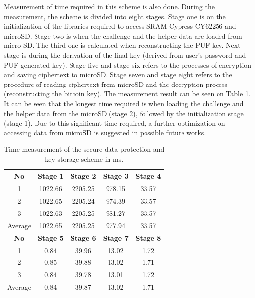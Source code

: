 Measurement of time required in this scheme is also done. During the measurement, the scheme is divided into eight stages. Stage one is on the initialization of the libraries required to access SRAM Cypress CY62256 and microSD. Stage two is when the challenge and the helper data are loaded from micro SD. The third one is calculated when reconstructing the PUF key. Next stage is during the derivation of the final key (derived from user's password and PUF-generated key). Stage five and stage six refers to the processes of encryption and saving ciphertext to microSD. Stage seven and stage eight refers to the procedure of reading ciphertext from microSD and the decryption process (reconstructing the bitcoin key). The measurement result can be seen on Table \ref{tab:time_scheme}. It can be seen that the longest time required is when loading the challenge and the helper data from the microSD (stage 2), followed by the initialization stage (stage 1). Due to this significant time required, a further optimization on accessing data from microSD is suggested in possible future works.

\begin{table}[htbp]
  \centering
  \caption{Time measurement of the secure data protection and key storage scheme in ms.}
    \begin{tabular}{|c|c|c|c|c|}
    \hline
    \textbf{No} & \textbf{Stage 1} & \textbf{Stage 2} & \textbf{Stage 3} & \textbf{Stage 4} \\
    \hline
    1     & 1022.66 & 2205.25 & 978.15 & 33.57 \\
    \hline
    2     & 1022.65 & 2205.24 & 974.39 & 33.57 \\
    \hline
    3     & 1022.63 & 2205.25 & 981.27 & 33.57 \\
    \hline
    Average & 1022.65 & 2205.25 & 977.94 & 33.57 \\
    \hline
    \textbf{No} & \textbf{Stage 5} & \textbf{Stage 6} & \textbf{Stage 7} & \textbf{Stage 8} \\
    \hline
    1     & 0.84  & 39.96 & 13.02 & 1.72 \\
    \hline
    2     & 0.85  & 39.88 & 13.02 & 1.71 \\
    \hline
    3     & 0.84  & 39.78 & 13.01 & 1.72 \\
    \hline
    Average & 0.84  & 39.87 & 13.02 & 1.71 \\
    \hline
    \end{tabular}%
  \label{tab:time_scheme}%
\end{table}%

